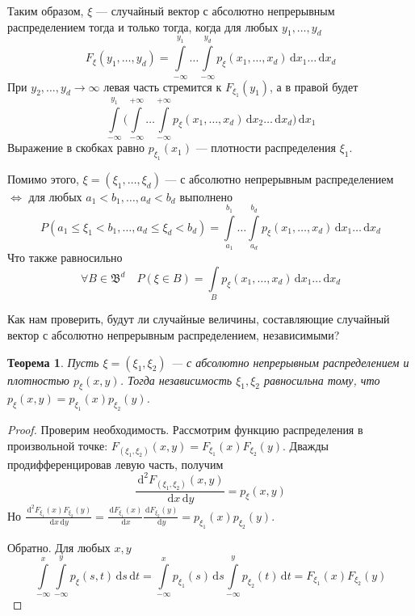 \documentclass[11pt,openany,a4paper]{scrartcl}
\theoremstyle{plain}
\newtheorem{theorem}{Теорема}[subsection]
\theoremstyle{definition}
\newcommand{\dif}{\, \mathrm d}
\begin{document}
Таким образом, $\xi$ — случайный вектор с абсолютно непрерывным 
распределением тогда и только тогда, когда для любых $y_1, \ldots, y_d$
$$
F_\xi(y_1, \ldots, y_d) = \int\limits_{-\infty}^{y_1}\ldots
\int\limits_{-\infty}^{y_d} p_\xi(x_1, \ldots, x_d) \dif x_1\ldots \dif x_d
$$
При $y_2, \ldots, y_d \to \infty$ левая часть стремится к $F_{\xi_1}(y_1)$,
а в правой будет
$$
\int\limits_{-\infty}^{y_1}\Bigg(\int\limits_{-\infty}^{+\infty}\ldots
\int\limits_{-\infty}^{+\infty} p_\xi(x_1, \ldots, x_d)
\dif x_2\ldots\dif x_d\Bigg)\dif x_1
$$
Выражение в скобках равно $p_{\xi_1}(x_1)$ — плотности распределения $\xi_1$.

Помимо этого, $\xi = (\xi_1, \ldots, \xi_d)$ —
с абсолютно непрерывным распределением
$\iff$ для любых $a_1 < b_1, \ldots, a_d < b_d$ выполнено
$$
P(a_1 \leqslant \xi_1 < b_1, \ldots, a_d \leqslant \xi_d < b_d) =
\int\limits_{a_1}^{b_1}\ldots\int\limits_{a_d}^{b_d} p_\xi(x_1, \ldots, x_d)
\dif x_1\ldots \dif x_d
$$
Что также равносильно
$$
\forall B \in \mathfrak B^d\quad P(\xi \in B) = \int\limits_B p_\xi(x_1, \ldots, x_d)
\dif x_1\ldots \dif x_d
$$

Как нам проверить, будут ли случайные величины, составляющие случайный вектор
с абсолютно непрерывным распределением, независимыми?

\begin{theorem}
    Пусть $\xi = (\xi_1, \xi_2)$ — с абсолютно непрерывным распределением и 
    плотностью $p_\xi(x, y)$. Тогда независимость $\xi_1, \xi_2$ равносильна
    тому, что $p_\xi(x, y) = p_{\xi_1}(x)p_{\xi_2}(y)$.
\end{theorem}
\begin{proof}
    Проверим необходимость. Рассмотрим функцию распределения в произвольной точке:
    $F_{(\xi_1, \xi_2)}(x, y) = F_{\xi_1}(x)F_{\xi_2}(y)$. Дважды 
    продифференцировав левую часть, получим
    $$
    \frac{\dif^2 F_{(\xi_1, \xi_2)}(x, y)}{\dif x \dif y} = p_\xi(x, y)
    $$
    Но $\frac{\dif^2 F_{\xi_1}(x)F_{\xi_2}(y)}{\dif x \dif y} =
    \frac{\dif F_{\xi_1}(x)}{\dif x}\frac{\dif F_{\xi_2}(y)}{\dif y} =
    p_{\xi_1}(x)p_{\xi_2}(y)$.
    
    Обратно. Для любых $x, y$
    $$
    \int\limits_{-\infty}^x\int\limits_{-\infty}^y p_\xi(s, t) \dif s \dif t =
    \int\limits_{-\infty}^x p_{\xi_1}(s) \dif s
    \int\limits_{-\infty}^y p_{\xi_2}(t) \dif t =
    F_{\xi_1}(x)F_{\xi_2}(y)
    $$
\end{proof}
\end{document}
